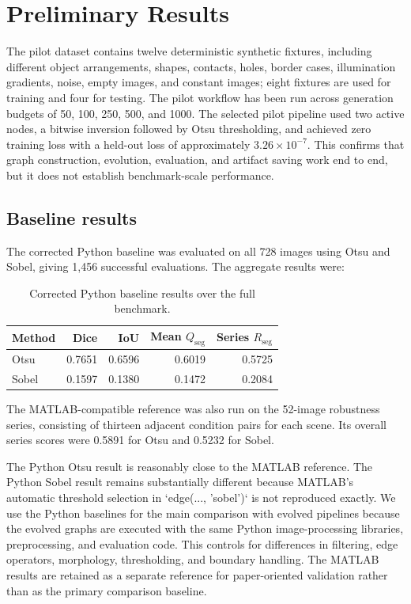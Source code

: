 \documentclass[11pt,a4paper]{article}
\begin{document}
\section{Preliminary Results}
\label{sec:preliminary}

The pilot dataset contains twelve deterministic synthetic fixtures, including different object arrangements, shapes, contacts, holes, border cases, illumination gradients, noise, empty images, and constant images; eight fixtures are used for training and four for testing. The pilot workflow has been run across generation budgets of 50, 100, 250, 500, and 1000. The selected pilot pipeline used two active nodes, a bitwise inversion followed by Otsu thresholding, and achieved zero training loss with a held-out loss of approximately $3.26\times10^{-7}$. This confirms that graph construction, evolution, evaluation, and artifact saving work end to end, but it does not establish benchmark-scale performance.

\subsection{Baseline results}

The corrected Python baseline was evaluated on all 728 images using Otsu and Sobel, giving 1,456 successful evaluations. The aggregate results were:

\begin{table}[htbp]
\centering
\small
\caption{Corrected Python baseline results over the full benchmark.}
\label{tab:python-baselines}
\begin{tabular}{lrrrr}
\toprule
Method & Dice & IoU & Mean $Q_{\mathrm{seg}}$ & Series $R_{\mathrm{seg}}$\\
\midrule
Otsu  & 0.7651 & 0.6596 & 0.6019 & 0.5725\\
Sobel & 0.1597 & 0.1380 & 0.1472 & 0.2084\\
\bottomrule
\end{tabular}
\end{table}

The MATLAB-compatible reference was also run on the 52-image robustness series, consisting of thirteen adjacent condition pairs for each scene. Its overall series scores were 0.5891 for Otsu and 0.5232 for Sobel.

The Python Otsu result is reasonably close to the MATLAB reference. The Python Sobel result remains substantially different because MATLAB's automatic threshold selection in `edge(..., 'sobel')` is not reproduced exactly. We use the Python baselines for the main comparison with evolved pipelines because the evolved graphs are executed with the same Python image-processing libraries, preprocessing, and evaluation code. This controls for differences in filtering, edge operators, morphology, thresholding, and boundary handling. The MATLAB results are retained as a separate reference for paper-oriented validation rather than as the primary comparison baseline.
\end{document}
